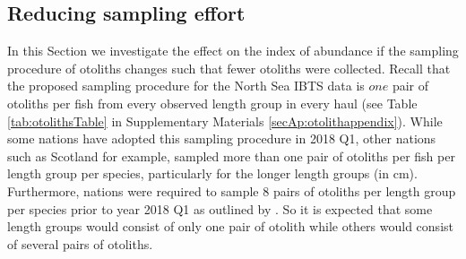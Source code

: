 \documentclass[a4paper 12pt]{article}
\numberwithin{equation}{section}
\begin{document}
\subsection{Reducing sampling effort}
\label{sec:optimizationsampling}

In this Section we investigate the effect on the index of abundance if the sampling procedure of otoliths changes such that fewer otoliths were collected. Recall that the proposed sampling procedure for the North Sea IBTS data is $one$ pair of otoliths per fish from every observed length group in every haul (see Table \ref{tab:otolithsTable} in Supplementary Materials \ref{secAp:otolithappendix}). While some nations have adopted this sampling procedure in 2018 Q1, other nations such as Scotland for example, sampled more than one pair of otoliths per fish per length group per species, particularly for the longer length groups (in cm). Furthermore, nations were required to sample 8 pairs of otoliths per length group per species prior to year 2018 Q1 as outlined by \citet{ICES2006Report}. So it is expected that some length groups would consist of only one pair of otolith while others would consist of several pairs of otoliths. 
\end{document}
